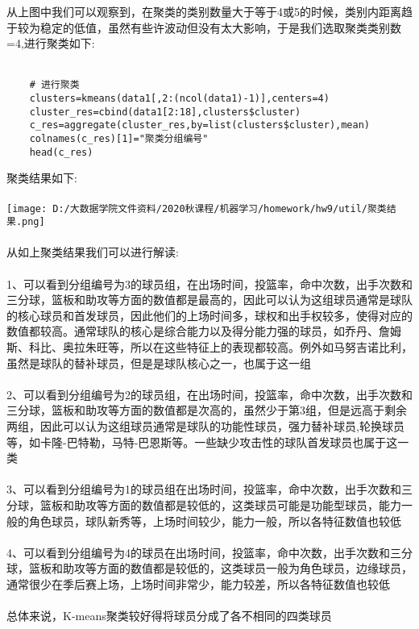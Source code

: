 \documentclass[]{article}
\begin{document}
从上图中我们可以观察到，在聚类的类别数量大于等于4或5的时候，类别内距离趋于较为稳定的低值，虽然有些许波动但没有太大影响，于是我们选取聚类类别数=4,进行聚类如下:\\\\
\begin{lstlisting}
	# 进行聚类
	clusters=kmeans(data1[,2:(ncol(data1)-1)],centers=4)
	cluster_res=cbind(data1[2:18],clusters$cluster)
	c_res=aggregate(cluster_res,by=list(clusters$cluster),mean)
	colnames(c_res)[1]="聚类分组编号"
	head(c_res)
\end{lstlisting}
聚类结果如下:\\\\
\texttt{[image: D:/大数据学院文件资料/2020秋课程/机器学习/homework/hw9/util/聚类结果.png]}\\\\
从如上聚类结果我们可以进行解读:\\\\
1、可以看到分组编号为3的球员组，在出场时间，投篮率，命中次数，出手次数和三分球，篮板和助攻等方面的数值都是最高的，因此可以认为这组球员通常是球队的核心球员和首发球员，因此他们的上场时间多，球权和出手权较多，使得对应的数值都较高。通常球队的核心是综合能力以及得分能力强的球员，如乔丹、詹姆斯、科比、奥拉朱旺等，所以在这些特征上的表现都较高。例外如马努吉诺比利，虽然是球队的替补球员，但是是球队核心之一，也属于这一组\\\\
2、可以看到分组编号为2的球员组，在出场时间，投篮率，命中次数，出手次数和三分球，篮板和助攻等方面的数值都是次高的，虽然少于第3组，但是远高于剩余两组，因此可以认为这组球员通常是球队的功能性球员，强力替补球员,轮换球员等，如卡隆-巴特勒，马特-巴恩斯等。一些缺少攻击性的球队首发球员也属于这一类\\\\
3、可以看到分组编号为1的球员组在出场时间，投篮率，命中次数，出手次数和三分球，篮板和助攻等方面的数值都是较低的，这类球员可能是功能型球员，能力一般的角色球员，球队新秀等，上场时间较少，能力一般，所以各特征数值也较低\\\\
4、可以看到分组编号为4的球员在出场时间，投篮率，命中次数，出手次数和三分球，篮板和助攻等方面的数值都是较低的，这类球员一般为角色球员，边缘球员，通常很少在季后赛上场，上场时间非常少，能力较差，所以各特征数值也较低\\\\
总体来说，K-means聚类较好得将球员分成了各不相同的四类球员\\\\
\end{document}
